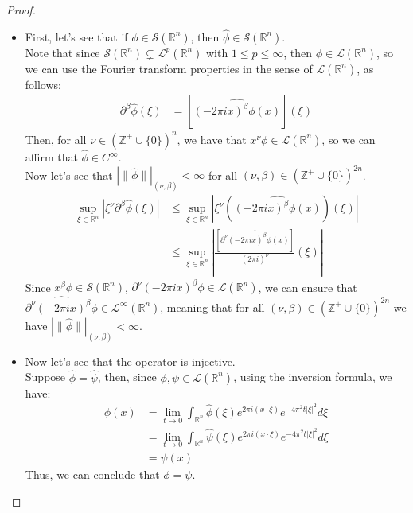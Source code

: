 \begin{proof}{}
	\begin{itemize}
		\item First, let's see that if $\phi\in\mathcal{S}(\mathbb{R}^n)$, then $\hat{\phi}\in\mathcal{S}(\mathbb{R}^n)$.\\
	    Note that since $\mathcal{S}(\mathbb{R}^n)\subsetneq \mathcal{L}^p(\mathbb{R}^n)$ with $1\leq p \leq \infty$, then $\phi\in\mathcal{L}(\mathbb{R}^n)$, so we can use the Fourier transform properties in the sense of $\mathcal{L}(\mathbb{R}^n)$, as follows:
	    \begin{align*}
	      \partial^{\beta}\hat{\phi}(\xi)&=[\hat{(-2\pi i x)^{\beta}\phi(x)}](\xi)
	    \end{align*}
	    Then, for all $\nu\in(\mathbb{Z}^+\cup\{0\})^n$, we have that $x^\nu \phi \in \mathcal{L}(\mathbb{R}^n)$, so we can affirm that $\hat{\phi}\in C^{\infty}$.\\
	    Now let's see that $|\|\hat{\phi}\||_{(\nu,\beta)}<\infty$ for all $(\nu,\beta)\in(\mathbb{Z}^+\cup\{0\})^{2n}$.
	    \begin{align*}
	    	\sup_{\xi\in\mathbb{R}^n}|\xi^{\nu}\partial^{\beta}\hat{\phi}(\xi)|&\leq \sup_{\xi\in\mathbb{R}^n}|\xi^{\nu}(\hat{(-2\pi i x)^{\beta}\phi(x)})(\xi)|\\
	    	&\leq \sup_{\xi\in\mathbb{R}^n}\left|\frac{[\hat{\partial^{\nu}(-2\pi i x)^{\beta}\phi(x)}]}{(2\pi i)^{\nu}}(\xi)\right|
	    \end{align*}
	    Since $x^{\beta}\phi\in\mathcal{S}(\mathbb{R}^n)$, $\partial^{\nu}(-2\pi ix)^{\beta}\phi\in\mathcal{L}(\mathbb{R}^n)$, we can ensure that $\hat{\partial^{\nu}(-2\pi ix)^{\beta}\phi}\in\mathcal{L}^{\infty}(\mathbb{R}^n)$, meaning that for all $(\nu,\beta)\in(\mathbb{Z}^+\cup\{0\})^{2n}$ we have $|\|\hat{\phi}\||_{(\nu,\beta)}<\infty$.
		\item Now let's see that the operator is injective.\\
		  Suppose $\hat{\phi}=\hat{\psi}$, then, since $\phi,\psi\in\mathcal{L}(\mathbb{R}^n)$, using the inversion formula, we have:
		  \begin{align*}
			  \phi(x)&=\lim_{t\rightarrow 0}\int_{\mathbb{R}^n}\hat{\phi}(\xi)e^{2\pi i (x\cdot \xi)}e^{-4\pi^2t|\xi|^2}d\xi\\
			  &=\lim_{t\rightarrow 0}\int_{\mathbb{R}^n}\hat{\psi}(\xi)e^{2\pi i (x\cdot \xi)}e^{-4\pi^2t|\xi|^2}d\xi\\
			  &=\psi(x)
		  \end{align*}
		  Thus, we can conclude that $\phi=\psi$.

\end{itemize}
\end{proof}
